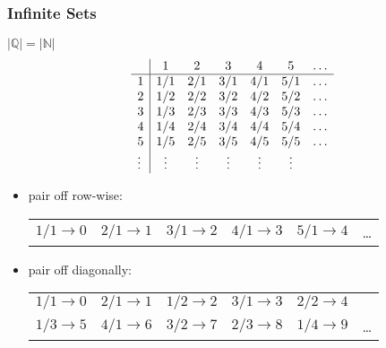 \documentclass[dvipsnames]{beamer}
\begin{document}
\begin{frame}
  \frametitle{Infinite Sets}

  \begin{footnotesize}
  \begin{block}{$|\mathbb{Q}| = |\mathbb{N}|$}
    \[
    \begin{array}{l|ccccccc|}
             &  $1$   &  $2$   &  $3$   &  $4$   &  $5$   & \ldots\\\hline
      $1$    & $1/1$  & $2/1$  & $3/1$  & $4/1$  & $5/1$  & \ldots\\
      $2$    & $1/2$  & $2/2$  & $3/2$  & $4/2$  & $5/2$  & \ldots\\
      $3$    & $1/3$  & $2/3$  & $3/3$  & $4/3$  & $5/3$  & \ldots\\
      $4$    & $1/4$  & $2/4$  & $3/4$  & $4/4$  & $5/4$  & \ldots\\
      $5$    & $1/5$  & $2/5$  & $3/5$  & $4/5$  & $5/5$  & \ldots\\
      \vdots & \vdots & \vdots & \vdots & \vdots & \vdots &
    \end{array}
    \]

    \begin{itemize}
      \item pair off row-wise:\\
      \begin{tabular}{llllll}
        $1/1 \rightarrow 0$ & $2/1 \rightarrow 1$ & $3/1 \rightarrow 2$
                            & $4/1 \rightarrow 3$ & $5/1 \rightarrow 4$ & \ldots\\
      \end{tabular}

      \pause
      \item pair off diagonally:\\
      \begin{tabular}{llllll}
        $1/1 \rightarrow 0$ & $2/1 \rightarrow 1$ & $1/2 \rightarrow 2$
                            & $3/1 \rightarrow 3$ & $2/2 \rightarrow 4$ & \\
        $1/3 \rightarrow 5$ & $4/1 \rightarrow 6$ & $3/2 \rightarrow 7$
                            & $2/3 \rightarrow 8$ & $1/4 \rightarrow 9$ & \ldots
      \end{tabular}
    \end{itemize}
  \end{block}
  \end{footnotesize}
\end{frame}
\end{document}
